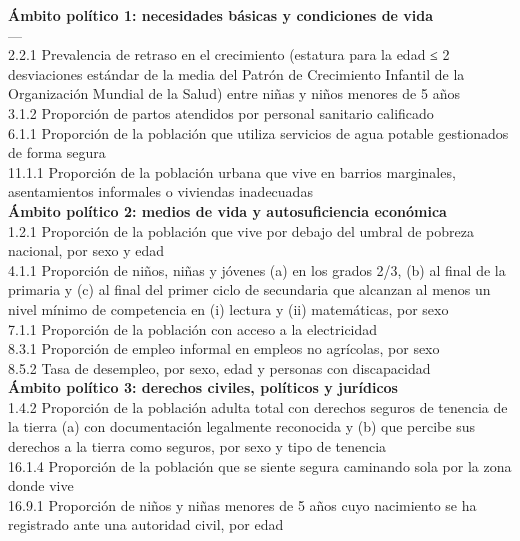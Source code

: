 \documentclass[
]{book}
\begin{document}
\textbf{Ámbito político 1: necesidades básicas y condiciones de vida} \textbar{}\\
--- \textbar{}\\
2.2.1 \textbar{} Prevalencia de retraso en el crecimiento (estatura para la edad ≤ 2 desviaciones estándar de la media del Patrón de Crecimiento Infantil de la Organización Mundial de la Salud) entre niñas y niños menores de 5 años \textbar{}\\
3.1.2 \textbar{} Proporción de partos atendidos por personal sanitario calificado \textbar{}\\
6.1.1 \textbar{} Proporción de la población que utiliza servicios de agua potable gestionados de forma segura \textbar{}\\
11.1.1 \textbar{} Proporción de la población urbana que vive en barrios marginales, asentamientos informales o viviendas inadecuadas \textbar{}\\
\textbf{Ámbito político 2: medios de vida y autosuficiencia económica} \textbar{}\\
1.2.1 \textbar{} Proporción de la población que vive por debajo del umbral de pobreza nacional, por sexo y edad \textbar{}\\
4.1.1 \textbar{} Proporción de niños, niñas y jóvenes (a) en los grados 2/3, (b) al final de la primaria y (c) al final del primer ciclo de secundaria que alcanzan al menos un nivel mínimo de competencia en (i) lectura y (ii) matemáticas, por sexo \textbar{}\\
7.1.1 \textbar{} Proporción de la población con acceso a la electricidad \textbar{}\\
8.3.1 \textbar{} Proporción de empleo informal en empleos no agrícolas, por sexo \textbar{}\\
8.5.2 \textbar{} Tasa de desempleo, por sexo, edad y personas con discapacidad \textbar{}\\
\textbf{Ámbito político 3: derechos civiles, políticos y jurídicos} \textbar{}\\
1.4.2 \textbar{} Proporción de la población adulta total con derechos seguros de tenencia de la tierra (a) con documentación legalmente reconocida y (b) que percibe sus derechos a la tierra como seguros, por sexo y tipo de tenencia \textbar{}\\
16.1.4 \textbar{} Proporción de la población que se siente segura caminando sola por la zona donde vive \textbar{}\\
16.9.1 \textbar{} Proporción de niños y niñas menores de 5 años cuyo nacimiento se ha registrado ante una autoridad civil, por edad \textbar{}
\end{document}

